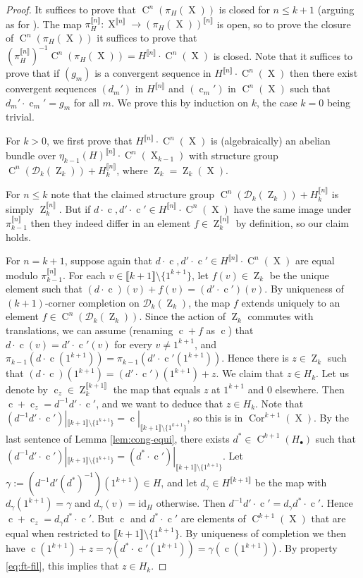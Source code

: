 \documentclass[a4paper,12pt,reqno]{amsart}
\theoremstyle{definition}
\def\to{\rightarrow}
\newcommand*{\db}[1]{\llbracket #1\rrbracket}
\newcommand{\mc}{\mathcal}
\newcommand{\id}{\mathrm{id}}
\DeclareMathOperator{\ab}{Z}
\DeclareMathOperator{\q}{c}
\DeclareMathOperator{\ns}{X}
\DeclareMathOperator{\cu}{C}
\DeclareMathOperator{\cor}{Cor}
\begin{document}
\begin{proof}
It suffices to prove that $\cu^n(\pi_H(\ns))$ is closed for $n\leq k+1$ (arguing as for  \cite[Lemma 2.1.1]{Cand:Notes2}).
The map $\pi_H^{\db{n}}:\ns^{\db{n}}\to (\pi_H(\ns))^{\db{n}}$ is open, so to prove the closure of $\cu^n(\pi_H(\ns))$ it suffices to prove that $(\pi_H^{\db{n}})^{-1}\cu^n(\pi_H(\ns))=H^{\db{n}} \cdot \cu^n(\ns)$ is closed. Note that it suffices to prove that if $(g_m)$ is a convergent sequence in $H^{\db{n}}\cdot \cu^n(\ns)$ then there exist convergent sequences $(d_m')$ in $H^{\db{n}}$ and $(\q_m')$ in $\cu^n(\ns)$ such that $d_m'\cdot \q_m' = g_m$ for all $m$. We prove this by induction on $k$, the case $k=0$ being trivial. 

For $k>0$, we first prove that $H^{\db{n}} \cdot \cu^n(\ns)$ is (algebraically) an abelian bundle over $\eta_{k-1}(H)^{\db{n}} \cdot \cu^n(\ns_{k-1})$ with structure group $\cu^n(\mc{D}_k(\ab_k))+H_k^{\db{n}}$, where $\ab_k=\ab_k(\ns)$.

For $n\le k$ note that the claimed structure group $\cu^n(\mc{D}_k(\ab_k))+H_k^{\db{n}}$ is simply $\ab_k^{\db{n}}$. But if $d\cdot \q, d'\cdot \q'\in  H^{\db{n}} \cdot\cu^n(\ns)$ have the same image under $\pi_{k-1}^{\db{n}}$ then they indeed differ in an element $f\in \ab_k^{\db{n}}$ by definition, so our claim holds.

For $n= k+1$, suppose again that $d\cdot \q, d'\cdot \q'\in H^{\db{n}}\cdot \cu^n(\ns)$ are equal modulo $\pi_{k-1}^{\db{n}}$. For each $v\in \db{k+1}\setminus\{1^{k+1}\}$, let $f(v)\in \ab_k$ be the unique element such that $(d\cdot \q)(v)+f(v)=(d'\cdot\q')(v)$. By uniqueness of $(k+1)$-corner completion on $\mc{D}_k(\ab_k)$, the map $f$ extends uniquely to an element $f\in \cu^n(\mc{D}_k(\ab_k))$. Since the action of $\ab_k$ commutes with translations, we can assume  (renaming $\q+f$ as $\q$) that $d\cdot \q(v)=d' \cdot \q'(v)$ for every $v\neq 1^{k+1}$, and $\pi_{k-1}(d\cdot \q(1^{k+1}))=\pi_{k-1}(d' \cdot \q'(1^{k+1}))$. Hence there is $z\in \ab_k$ such that $(d\cdot \q)(1^{k+1})=(d'\cdot \q')(1^{k+1})+z$. We claim that $z\in H_k$. Let us denote by $\q_z\in \ab_k^{\db{k+1}}$ the map that equals $z$ at  $1^{k+1}$ and 0 elsewhere. Then $\q+\q_z=d^{-1}d'\cdot \q'$, and we want to deduce that $z\in H_k$. Note that $(d^{-1}d'\cdot \q')|_{\db{k+1}\setminus\{1^{k+1}\}} = \q|_{\db{k+1}\setminus\{1^{k+1}\}}$, so this is in $\cor^{k+1}(\ns)$. By the last sentence of Lemma \ref{lem:cong-equi}, there exists $d^*\in \cu^{k+1}(H_\bullet)$ such that $(d^{-1}d'\cdot \q')|_{\db{k+1}\setminus\{1^{k+1}\}} = (d^*\cdot \q')|_{\db{k+1}\setminus\{1^{k+1}\}}$. Let $\gamma:=(d^{-1}d'(d^*)^{-1})(1^{k+1})\in H$, and let $d_\gamma\in H^{\db{k+1}}$ be the map with $d_\gamma(1^{k+1})=\gamma$ and $d_\gamma(v)=\id_H$ otherwise. Then $d^{-1}d'\cdot \q' = d_\gamma d^*\cdot \q'$.  Hence $\q+\q_z = d_\gamma d^*\cdot \q'$. But $\q$ and $d^*\cdot \q'$ are elements of $\cu^{k+1}(\ns)$ that are equal when restricted to $\db{k+1}\setminus\{1^{k+1}\}$. By uniqueness of completion we then have $\q(1^{k+1})+z= \gamma(d^*\cdot\q'(1^{k+1})) = \gamma(\q(1^{k+1}))$. By property \eqref{eq:ft-fil}, this implies that $z\in H_k$.


\end{proof}
\end{document}
